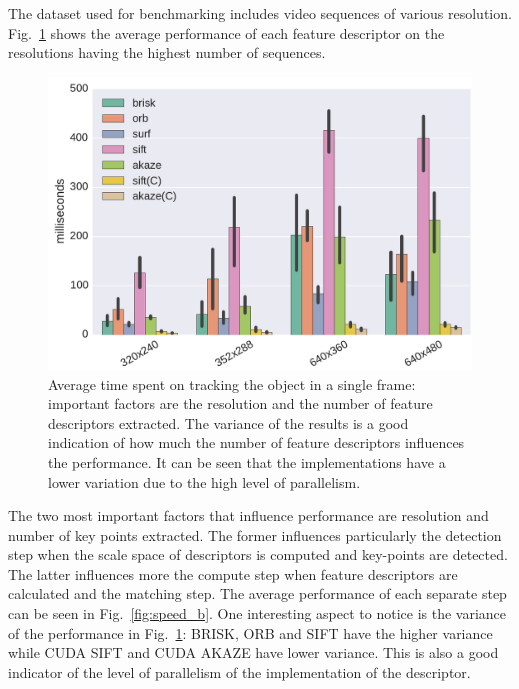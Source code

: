 The dataset used for benchmarking includes video sequences of various resolution. Fig.~\ref{fig:speed} shows the average performance of each feature descriptor on the resolutions having the highest number of sequences. 

\begin{figure}[!htb]
	\includegraphics[width=0.95\linewidth]{imgs/tracker_fps_std.pdf}
\vspace{-2.5mm}	
\caption{Average time spent on tracking the object in a single frame: important factors are the resolution and the number of feature descriptors extracted. The variance of the results is a good indication of how much the number of feature descriptors influences the performance. It can be seen that the implementations have a lower variation due to the high level of parallelism. }
\label{fig:speed}
\end{figure}

The two most important factors that influence performance are resolution and number of key points extracted. The former influences particularly the detection step when the scale space of descriptors is computed and key-points are detected. The latter influences more the compute step when feature descriptors are calculated and the matching step. The average performance of each separate step can be seen in Fig.~\ref{fig:speed_b}. One interesting aspect to notice is the variance of the performance in Fig.~\ref{fig:speed}: BRISK, ORB and SIFT have the higher variance while CUDA SIFT and CUDA AKAZE have lower variance. This is also a good indicator of the level of parallelism of the implementation of the descriptor.  


